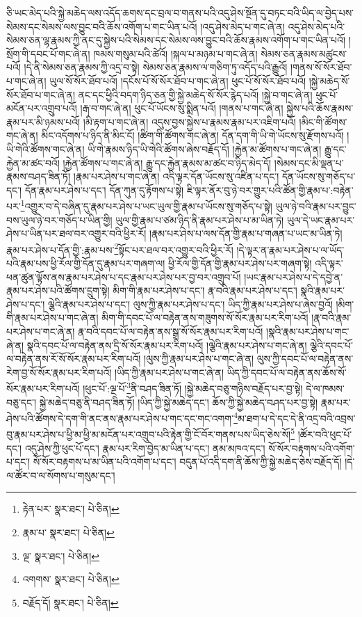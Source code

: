 ཅི་ཡང་མེད་པའི་སྐྱེ་མཆེད་ལས་འདོད་ཆགས་དང་བྲལ་བ་གནས་པའི་འདུ་ཤེས་སྔོན་དུ་བཏང་བའི་ཡིད་ལ་བྱེད་པས་སེམས་དང་སེམས་ལས་བྱུང་བའི་ཆོས་འགོག་པ་གང་ཡིན་པའོ། །འདུ་ཤེས་མེད་པ་གང་ཞེ་ན། འདུ་ཤེས་མེད་པའི་སེམས་ཅན་ལྷ་རྣམས་ཀྱི་ནང་དུ་སྐྱེས་པའི་སེམས་དང་སེམས་ལས་བྱུང་བའི་ཆོས་རྣམས་འགོག་པ་གང་ཡིན་པའོ། །སྲོག་གི་དབང་པོ་གང་ཞེ་ན། ཁམས་གསུམ་པའི་ཚེའོ། །སྐལ་པ་མཉམ་པ་གང་ཞེ་ན། སེམས་ཅན་རྣམས་མཚུངས་པའོ། །དེ་ནི་སེམས་ཅན་རྣམས་ཀྱི་འདྲ་བ་སྟེ། སེམས་ཅན་རྣམས་ལ་གཅིག་ཏུ་འདོད་པའི་རྒྱུའོ། །གནས་སོ་སོར་ཐོབ་པ་གང་ཞེ་ན། ཡུལ་སོ་སོར་ཐོབ་པའོ། །དངོས་པོ་སོ་སོར་ཐོབ་པ་གང་ཞེ་ན། ཕུང་པོ་སོ་སོར་ཐོབ་པའོ། །སྐྱེ་མཆེད་སོ་སོར་ཐོབ་པ་གང་ཞེ་ན། ནང་དང་ཕྱིའི་བདག་ཉིད་ཅན་གྱི་སྐྱེ་མཆེད་སོ་སོར་རྙེད་པའོ། །སྐྱེ་བ་གང་ཞེ་ན། ཕུང་པོ་མངོན་པར་འགྲུབ་པའོ། །རྒ་བ་གང་ཞེ་ན། ཕུང་པོ་ཡོངས་སུ་སྨིན་པའོ། །གནས་པ་གང་ཞེ་ན། སྐྱེས་པའི་ཆོས་རྣམས་རྣམ་པར་མི་ཉམས་པའོ། །མི་རྟག་པ་གང་ཞེ་ན། འདུས་བྱས་སྐྱེས་པ་རྣམས་རྣམ་པར་འཇིག་པའོ། །མིང་གི་ཚོགས་གང་ཞེ་ན། མིང་འདོགས་པ་ཉིད་ནི་མིང་ངོ། །ཚིག་གི་ཚོགས་གང་ཞེ་ན། དོན་དག་གི་ཡི་གེ་ཡོངས་སུ་རྫོགས་པའོ། །ཡི་གེའི་ཚོགས་གང་ཞེ་ན། ཡི་གེ་རྣམས་ཉིད་ཡི་གེའི་ཚོགས་ཞེས་བརྗོད་དོ། །རྐྱེན་མ་ཚོགས་པ་གང་ཞེ་ན། རྒྱུ་དང་རྐྱེན་མ་ཚང་བའོ། །རྐྱེན་ཚོགས་པ་གང་ཞེ་ན། རྒྱུ་དང་རྐྱེན་རྣམས་མ་ཚང་བ་ཉིད་མེད་དོ། །སེམས་དང་མི་ལྡན་པ་རྣམས་བཤད་ཟིན་ཏོ། །རྣམ་པར་ཤེས་པ་གང་ཞེ་ན། འདི་ལྟར་དོན་ཡོངས་སུ་འཛིན་པ་དང་། དོན་ཡོངས་སུ་གཅོད་པ་དང་། དོན་རྣམ་པར་ཤེས་པ་དང་། དོན་ཀུན་དུ་རྟོགས་པ་སྟེ། ཇི་ལྟར་ནོར་བུ་ཉེ་བར་གྱུར་པའི་ཚོན་གྱི་རྣམ་པ་:བརྟེན་པར་\footnote{རྟེན་པར་  སྣར་ཐང་།  པེ་ཅིན། }འགྱུར་བ་དེ་བཞིན་དུ་རྣམ་པར་ཤེས་པ་ཡང་ཡུལ་གྱི་རྣམ་པ་ཡོངས་སུ་གཅོད་པ་སྟེ། ཡུལ་ཉེ་བའི་རྣམ་པར་བྱུང་བས་ཡུལ་ཉེ་བར་གཅོད་པ་ཡིན་གྱི། ཡུལ་གྱི་རྣམ་པ་ཙམ་ཉིད་ནི་རྣམ་པར་ཤེས་པ་མ་ཡིན་ཏེ། ཡུལ་དེ་ཡང་རྣམ་པར་ཤེས་པ་ཡིན་པར་ཐལ་བར་འགྱུར་བའི་ཕྱིར་རོ། །རྣམ་པར་ཤེས་པ་ལས་དོན་གྱི་རྣམ་པ་གཞན་པ་ཡང་མ་ཡིན་ཏེ། རྣམ་པར་ཤེས་པ་དོན་གྱི་:རྣམ་པས་\footnote{རྣམ་པ་  སྣར་ཐང་།  པེ་ཅིན། }སྟོང་པར་ཐལ་བར་འགྱུར་བའི་ཕྱིར་རོ། །དེ་ལྟར་ན་རྣམ་པར་ཤེས་པ་ལ་ཡོད་པའི་རྣམ་པས་ཕྱི་རོལ་གྱི་དོན་དུ་རྣམ་པར་གཞག་ལ། ཕྱི་རོལ་གྱི་དོན་གྱི་རྣམ་པར་ཤེས་པར་གཞག་སྟེ། འདི་ལྟར་ཕན་ཚུན་ལྟོས་ནས་རྣམ་པར་ཤེས་པ་དང་རྣམ་པར་ཤེས་པར་བྱ་བར་འགྲུབ་པོ། །ཡང་རྣམ་པར་ཤེས་པ་དེ་དབྱེ་ན་རྣམ་པར་ཤེས་པའི་ཚོགས་དྲུག་སྟེ། མིག་གི་རྣམ་པར་ཤེས་པ་དང་། རྣ་བའི་རྣམ་པར་ཤེས་པ་དང་། སྣའི་རྣམ་པར་ཤེས་པ་དང་། ལྕེའི་རྣམ་པར་ཤེས་པ་དང་། ལུས་ཀྱི་རྣམ་པར་ཤེས་པ་དང་། ཡིད་ཀྱི་རྣམ་པར་ཤེས་པ་ཞེས་བྱའོ། །མིག་གི་རྣམ་པར་ཤེས་པ་གང་ཞེ་ན། མིག་གི་དབང་པོ་ལ་བརྟེན་ནས་གཟུགས་སོ་སོར་རྣམ་པར་རིག་པའོ། །རྣ་བའི་རྣམ་པར་ཤེས་པ་གང་ཞེ་ན། རྣ་བའི་དབང་པོ་ལ་བརྟེན་ནས་སྒྲ་སོ་སོར་རྣམ་པར་རིག་པའོ། །སྣའི་རྣམ་པར་ཤེས་པ་གང་ཞེ་ན། སྣའི་དབང་པོ་ལ་བརྟེན་ནས་དྲི་སོ་སོར་རྣམ་པར་རིག་པའོ། །ལྕེའི་རྣམ་པར་ཤེས་པ་གང་ཞེ་ན། ལྕེའི་དབང་པོ་ལ་བརྟེན་ནས་རོ་སོ་སོར་རྣམ་པར་རིག་པའོ། །ལུས་ཀྱི་རྣམ་པར་ཤེས་པ་གང་ཞེ་ན། ལུས་ཀྱི་དབང་པོ་ལ་བརྟེན་ནས་རེག་བྱ་སོ་སོར་རྣམ་པར་རིག་པའོ། །ཡིད་ཀྱི་རྣམ་པར་ཤེས་པ་གང་ཞེ་ན། ཡིད་ཀྱི་དབང་པོ་ལ་བརྟེན་ནས་ཆོས་སོ་སོར་རྣམ་པར་རིག་པའོ། །ཕུང་པོ་:ལྔ་པོ་\footnote{ལྔ་  སྣར་ཐང་།  པེ་ཅིན། }ནི་བཤད་ཟིན་ཏོ། །སྐྱེ་མཆེད་བཅུ་གཉིས་བརྗོད་པར་བྱ་སྟེ། དེ་ལ་ཁམས་བཅུ་དང་། སྐྱེ་མཆེད་བཅུ་ནི་བཤད་ཟིན་ཏོ། །ཡིད་ཀྱི་སྐྱེ་མཆེད་དང་། ཆོས་ཀྱི་སྐྱེ་མཆེད་བཤད་པར་བྱ་སྟེ། རྣམ་པར་ཤེས་པའི་ཚོགས་དེ་དག་གི་ནང་ནས་རྣམ་པར་ཤེས་པ་གང་དང་གང་འགག་\footnote{འགགས་  སྣར་ཐང་།  པེ་ཅིན། }མ་ཐག་པ་དེ་དང་དེ་ནི་འདྲ་བའི་འབྲས་བུ་རྣམ་པར་ཤེས་པ་ཕྱི་མ་ཕྱི་མ་མངོན་པར་འགྲུབ་པའི་རྟེན་གྱི་ངོ་བོར་གནས་པས་ཡིད་ཅེས་སོ།\footnote{བརྗོད་དོ།  སྣར་ཐང་།  པེ་ཅིན། } །ཚོར་བའི་ཕུང་པོ་དང་། འདུ་ཤེས་ཀྱི་ཕུང་པོ་དང་། རྣམ་པར་རིག་བྱེད་མ་ཡིན་པ་དང་། ནམ་མཁའ་དང་། སོ་སོར་བརྟགས་པའི་འགོག་པ་དང་། སོ་སོར་བརྟགས་པ་མ་ཡིན་པའི་འགོག་པ་དང་། བདུན་པོ་འདི་དག་ནི་ཆོས་ཀྱི་སྐྱེ་མཆེད་ཅེས་བརྗོད་དོ། །དེ་ལ་ཚོར་བ་ལ་སོགས་པ་གསུམ་དང་། 
